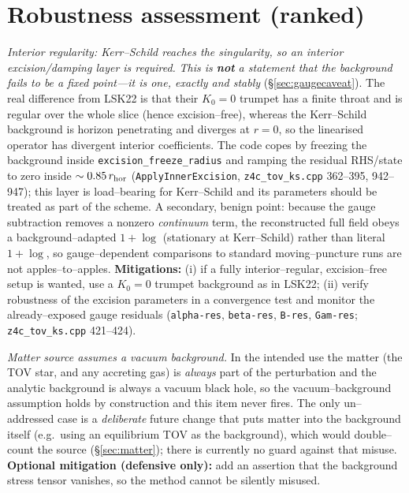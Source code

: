 \documentclass[11pt]{article}
\newcommand{\code}[1]{\texttt{#1}}
\newcommand{\file}[1]{\texttt{#1}}
\begin{document}
\section{Robustness assessment (ranked)}
\label{sec:robust}

\newcommand{\sev}[1]{\textbf{[#1]}}

\begin{description}[leftmargin=2.2em,style=unboxed,itemsep=4pt]

\item[R1 \sev{Design trade--off / Low--Medium}] \emph{Interior regularity:
Kerr--Schild reaches the singularity, so an interior excision/damping layer is
required.} \emph{This is \textbf{not} a statement that the background fails to be
a fixed point---it is one, exactly and stably} (\S\ref{sec:gaugecaveat}). The
real difference from LSK22 is that their $K_0=0$ trumpet has a finite throat and
is regular over the whole slice (hence excision--free), whereas the
Kerr--Schild background is horizon penetrating and diverges at $r=0$, so the
linearised operator has divergent interior coefficients. The code copes by
freezing the background inside \code{excision\_freeze\_radius} and ramping the
residual RHS/state to zero inside $\sim0.85\,r_{\rm hor}$
(\code{ApplyInnerExcision}, \file{z4c\_tov\_ks.cpp} 362--395, 942--947); this
layer is load--bearing for Kerr--Schild and its parameters should be treated as
part of the scheme. A secondary, benign point: because the gauge subtraction
removes a nonzero \emph{continuum} term, the reconstructed full field obeys a
background--adapted $1+\log$ (stationary at Kerr--Schild) rather than literal
$1+\log$, so gauge--dependent comparisons to standard moving--puncture runs are
not apples--to--apples. \textbf{Mitigations:} (i) if a fully interior--regular,
excision--free setup is wanted, use a $K_0=0$ trumpet background as in LSK22;
(ii) verify robustness of the excision parameters in a convergence test and
monitor the already--exposed gauge residuals (\code{alpha-res}, \code{beta-res},
\code{B-res}, \code{Gam-res}; \file{z4c\_tov\_ks.cpp} 421--424).

\item[R2 \sev{By design / Cosmetic}] \emph{Matter source assumes a vacuum
background.} In the intended use the matter (the TOV star, and any accreting
gas) is \emph{always} part of the perturbation and the analytic background is
always a vacuum black hole, so the vacuum--background assumption holds by
construction and this item never fires. The only un--addressed case is a
\emph{deliberate} future change that puts matter into the background itself
(e.g.\ using an equilibrium TOV as the background), which would double--count
the source (\S\ref{sec:matter}); there is currently no guard against that
misuse. \textbf{Optional mitigation (defensive only):} add an assertion that the
background stress tensor vanishes, so the method cannot be silently misused.


\end{description}
\end{document}
